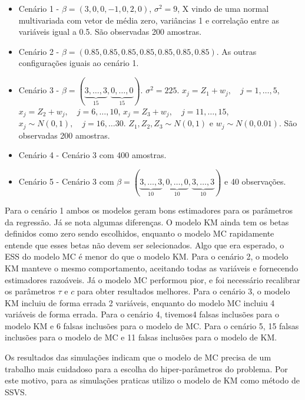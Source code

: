 \begin{itemize}
    \item Cenário 1 - $\beta = (3,0,0,-1,0,2,0)$, $\sigma^2 = 9$, X vindo de uma normal multivariada com vetor de média zero, variâncias 1 e correlação entre as variáveis igual a 0.5. São observadas 200 amostras.
    \item Cenário 2 - $\beta = (0.85,0.85,0.85,0.85,0.85,0.85,0.85)$. As outras configurações iguais ao cenário 1.
    \item Cenário 3 - $\beta = (\underbrace{3,\dots,3}_{15},\underbrace{0,\dots,0}_{15})$. $\sigma^2 = 225$. $x_j = Z_1 + w_j,\quad j=1,\dots,5$, $x_j = Z_2 + w_j,\quad j=6,\dots,10$, $x_j = Z_3 + w_j,\quad j=11,\dots,15$, $x_j \sim N(0,1), \quad j=16, \dots 30$. $Z_1, Z_2, Z_3 \sim N(0,1)$ e $w_j \sim N(0,0.01)$. São observadas 200 amostras. 
    \item Cenário 4 - Cenário 3 com 400 amostras.
    \item Cenário 5 - Cenário 3 com $\beta = (\underbrace{3,\dots,3}_{10}, \underbrace{0,\dots,0}_{10}, \underbrace{3,\dots,3}_{10})$ e 40 observações.
\end{itemize}

Para o cenário 1 ambos os modelos geram bons estimadores para os parâmetros da regressão. Já se nota algumas diferenças. O modelo KM ainda tem os betas definidos como zero sendo escolhidos, enquanto o modelo MC rapidamente entende que esses betas não devem ser selecionados. Algo que era esperado, o ESS do modelo MC é menor do que o modelo KM. Para o cenário 2, o modelo KM manteve o mesmo comportamento, aceitando todas as variáveis e fornecendo estimadores razoáveis. Já o modelo MC performou pior, e foi necessário recalibrar os parâmetros $\tau$ e $c$ para obter resultados melhores. Para o cenário 3, o modelo KM incluiu de forma errada 2 variáveis, enquanto do modelo MC incluiu 4 variáveis de forma errada. Para o cenário 4, tivemos4 falsas inclusões para o modelo KM e 6 falsas inclusões para o modelo de MC. Para o cenário 5, 15 falsas inclusões para o modelo de MC e 11 falsas inclusões para o modelo de KM. 

Os resultados das simulações indicam que o modelo de MC precisa de um trabalho mais cuidadoso para a escolha do hiper-parâmetros do problema. Por este motivo, para as simulações praticas utilizo o modelo de KM como método de SSVS. 




